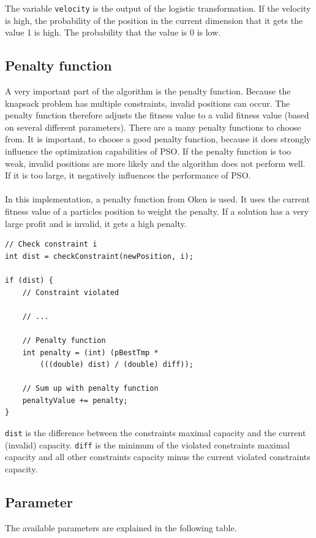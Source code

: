 \documentclass{article}
\begin{document}
The variable \lstinline{velocity} is the output of the logistic transformation. If the velocity is high, the probability of the position in the current dimension that it gets the value 1 is high. The probability that the value is 0 is low.

\subsection{Penalty function}
A very important part of the algorithm is the penalty function. Because the knapsack problem has multiple constraints, invalid positions can occur. The penalty function therefore adjusts the fitness value to a valid fitness value (based on several different parameters). There are a many penalty functions to choose from. It is important, to choose a good penalty function, because it does strongly influence the optimization capabilities of PSO. If the penalty function is too weak, invalid positions are more likely and the algorithm does not perform well. If it is too large, it negatively influences the performance of PSO.\\ \\
In this implementation, a penalty function from Oken \cite{bib-penalty} is used. It uses the current fitness value of a particles position to weight the penalty. If a solution has a very large profit and is invalid, it gets a high penalty.

\begin{lstlisting}[caption="Solver.cpp"]
// Check constraint i
int dist = checkConstraint(newPosition, i);

if (dist) {
	// Constraint violated
	
	// ...
	
	// Penalty function
	int penalty = (int) (pBestTmp *
		(((double) dist) / (double) diff));
		
	// Sum up with penalty function
	penaltyValue += penalty;
}
\end{lstlisting}

\lstinline{dist} is the difference between the constraints maximal capacity and the current (invalid) capacity. \lstinline{diff} is the minimum of the violated constraints maximal capacity and all other constraints capacity minus the current violated constraints capacity.

\subsection{Parameter}
The available parameters are explained in the following table.\\
\end{document}
